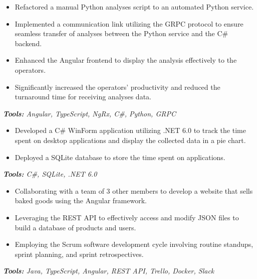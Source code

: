 \documentclass[10pt,letter]{altacv}
\begin{document}
\divider

\begin{itemize}
  \item Refactored a manual Python analyses script to an automated Python service.
  \item Implemented a communication link utilizing the GRPC protocol to ensure seamless transfer of analyses between the Python service and the C\# backend.
  \item Enhanced the Angular frontend to display the analysis effectively to the operators.
  \item Significantly increased the operators' productivity and reduced the turnaround time for receiving analyses data.
\end{itemize}
\textit{\textbf{Tools:} Angular, TypeScript, NgRx,  C\#, Python, GRPC}

\medskip


\begin{itemize}
  \item Developed a C\# WinForm application utilizing .NET 6.0 to track the time spent on desktop applications and display the collected data in a pie chart.
  \item Deployed a SQLite database to store the time spent on applications.
\end{itemize}
\textit{\textbf{Tools:} C\#, SQLite, .NET 6.0}

\divider

\begin{itemize}
  \item Collaborating with a team of 3 other members to develop a website that sells baked goods using the Angular framework.
  \item Leveraging the REST API to effectively access and modify JSON files to build a database of products and users.
  \item Employing the Scrum software development cycle involving routine standups, sprint planning, and sprint retrospectives.
\end{itemize}
\textit{\textbf{Tools:} Java, TypeScript, Angular, REST API, Trello, Docker, Slack}
\end{document}
